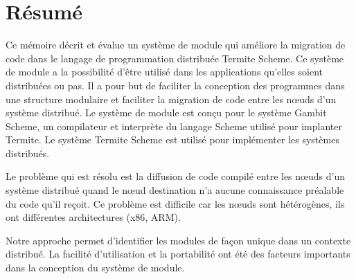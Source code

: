 \documentclass[12pt,maitrise]{dms}
\theoremstyle{definition}
\numberwithin{equation}{section}
\numberwithin{table}{chapter}
\numberwithin{figure}{chapter}
\begin{document}


\maketitle

\maketitle

\chapter*{Résumé}
Ce mémoire décrit et évalue un système de module qui améliore la migration de
code dans le langage de programmation distribuée Termite Scheme. Ce système de
module a la possibilité d'être utilisé dans les applications qu'elles soient
distribuées ou pas.  Il a pour but de faciliter la conception des programmes
dans une structure modulaire et faciliter la migration de code entre les nœuds
d'un système distribué. Le système de module est conçu pour le système Gambit
Scheme, un compilateur et interprète du langage Scheme utilisé pour implanter
Termite. Le système Termite Scheme est utilisé pour implémenter les systèmes
distribués.

Le problème qui est résolu est la diffusion de code compilé entre les nœuds
d'un système distribué quand le nœud destination n'a aucune connaissance
préalable du code qu'il reçoit. Ce problème est difficile car les nœuds sont
hétérogènes, ils ont différentes architectures (x86, ARM).

Notre approche permet d'identifier les modules
de façon unique dans un contexte distribué. La facilité
d'utilisation et la portabilité ont été des facteurs importants
dans la conception du système de module.
\end{document}
